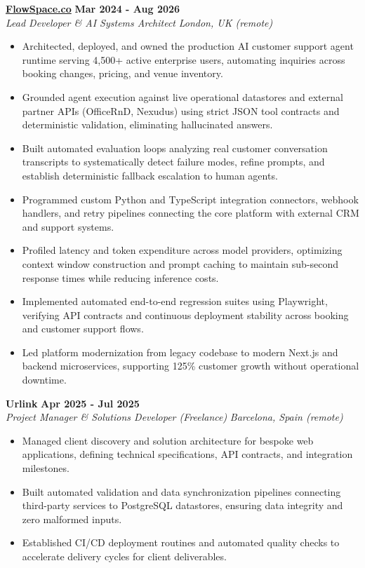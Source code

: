 \documentclass[10pt,a4paper]{article}
\newcommand{\role}[4]{%
  \textbf{#1} \hfill \textbf{#2}\\[1pt]%
  \textit{#3} \hfill \textit{#4}\\[2pt]%
}
\begin{document}
\role{\href{https://flowspace.co}{FlowSpace.co}}{Mar 2024 - Aug 2026}{Lead Developer \& AI Systems Architect}{London, UK (remote)}
\begin{itemize}
  \item Architected, deployed, and owned the production AI customer support agent runtime serving 4,500+ active enterprise users, automating inquiries across booking changes, pricing, and venue inventory.
  \item Grounded agent execution against live operational datastores and external partner APIs (OfficeRnD, Nexudus) using strict JSON tool contracts and deterministic validation, eliminating hallucinated answers.
  \item Built automated evaluation loops analyzing real customer conversation transcripts to systematically detect failure modes, refine prompts, and establish deterministic fallback escalation to human agents.
  \item Programmed custom Python and TypeScript integration connectors, webhook handlers, and retry pipelines connecting the core platform with external CRM and support systems.
  \item Profiled latency and token expenditure across model providers, optimizing context window construction and prompt caching to maintain sub-second response times while reducing inference costs.
  \item Implemented automated end-to-end regression suites using Playwright, verifying API contracts and continuous deployment stability across booking and customer support flows.
  \item Led platform modernization from legacy codebase to modern Next.js and backend microservices, supporting 125\% customer growth without operational downtime.
\end{itemize}

\role{Urlink}{Apr 2025 - Jul 2025}{Project Manager \& Solutions Developer (Freelance)}{Barcelona, Spain (remote)}
\begin{itemize}
  \item Managed client discovery and solution architecture for bespoke web applications, defining technical specifications, API contracts, and integration milestones.
  \item Built automated validation and data synchronization pipelines connecting third-party services to PostgreSQL datastores, ensuring data integrity and zero malformed inputs.
  \item Established CI/CD deployment routines and automated quality checks to accelerate delivery cycles for client deliverables.
\end{itemize}
\end{document}
